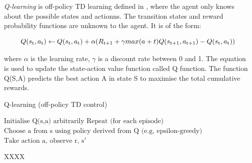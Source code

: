 \documentclass[12pt,twoside]{report}
\theoremstyle{plain}
\theoremstyle{definition}
\begin{document}

\textit{Q-learning} is off-policy TD learning defined in \cite{Watkins}, where the agent only knows about the possible states and actionns. The transition states and reward probability functions are unknown to the agent.
It is of the form:

\begin{equation}
Q(s\textsubscript{t},a\textsubscript{t}) \leftarrow Q(s\textsubscript{t},a\textsubscript{t}) +  \alpha(R\textsubscript{t+1} + \gamma  max (a+t) Q(s\textsubscript{t+1}, a\textsubscript{t+1}) - Q(s\textsubscript{t}, a\textsubscript{t}))
\end{equation}

where $\alpha$ is the learning rate, $\gamma$ is a discount rate between 0 and 1. The equation is used to update the state-action value function called Q function. The function Q(S,A) predicts the best action A in state S to maximise the total cumulative rewards.

\begin{algorithm}
\caption{Q-learning (off-policy TD control)}\label{euclid}
\begin{algorithmic}[1]

\State $\text{Initialise Q(s,a) arbitrarily}$
\State $\text{Repeat (for each episode)}$
\State $\text{Choose a from s using policy derived from Q (e.g, epsilon-greedy)}$
\State $\text{Take action a, observe r,  s$\prime$}$




\EndProcedure
\caption{XXXX }
\end{algorithmic}
\end{algorithm}
\end{document}
